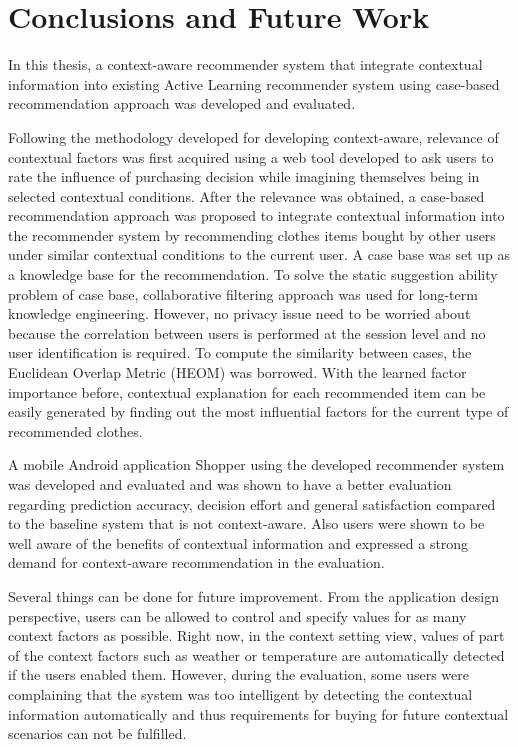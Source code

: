 \chapter{Conclusions and Future Work}\label{chapter:conclusions}

In this thesis, a context-aware recommender system that integrate contextual information into existing Active Learning recommender system using case-based recommendation approach was developed and evaluated.

Following the methodology developed for developing context-aware, relevance of contextual factors was first acquired using a web tool developed to ask users to rate the influence of purchasing decision while imagining themselves being in selected contextual conditions. After the relevance was obtained, a case-based recommendation approach was proposed to integrate contextual information into the recommender system by recommending clothes items bought by other users under similar contextual conditions to the current user. A case base was set up as a knowledge base for the recommendation. To solve the static suggestion ability problem of case base, collaborative filtering approach was used for long-term knowledge engineering. However, no privacy issue need to be worried about because the correlation between users is performed at the session level and no user identification is required. To compute the similarity between cases, the Euclidean Overlap Metric (HEOM) was borrowed. With the learned factor importance before, contextual explanation for each recommended item can be easily generated by finding out the most influential factors for the current type of recommended clothes.

A mobile Android application Shopper using the developed recommender system was developed and evaluated and was shown to have a better evaluation regarding prediction accuracy, decision effort and general satisfaction compared to the baseline system that is not context-aware. Also users were shown to be well aware of the benefits of contextual information and expressed a strong demand for context-aware recommendation in the evaluation. 

Several things can be done for future improvement. From the application design perspective, users can be allowed to control and specify values for as many context factors as possible. Right now, in the context setting view, values of part of the context factors such as weather or temperature are automatically detected if the users enabled them. However, during the evaluation, some users were complaining that the system was too intelligent by detecting the contextual information automatically and thus requirements for buying for future contextual scenarios can not be fulfilled. 

